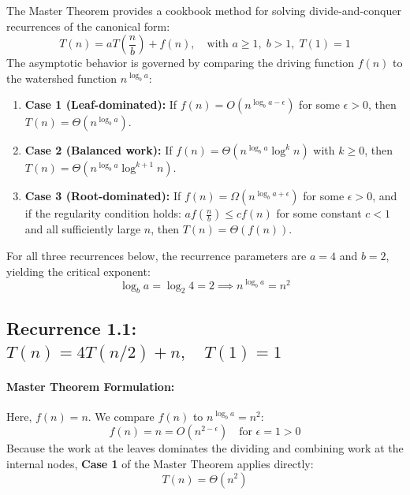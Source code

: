 \documentclass[12pt,a4paper]{article}
\theoremstyle{plain}
\theoremstyle{definition}
\theoremstyle{remark}
\begin{document}
The Master Theorem provides a cookbook method for solving divide-and-conquer recurrences of the canonical form:
\begin{equation}
T(n) = a T\left(\frac{n}{b}\right) + f(n), \quad \text{with } a \ge 1, \; b > 1, \; T(1) = 1
\end{equation}
The asymptotic behavior is governed by comparing the driving function $f(n)$ to the watershed function $n^{\log_b a}$:
\begin{enumerate}
    \item \textbf{Case 1 (Leaf-dominated):} If $f(n) = O\left(n^{\log_b a - \epsilon}\right)$ for some $\epsilon > 0$, then $T(n) = \Theta\left(n^{\log_b a}\right)$.
    \item \textbf{Case 2 (Balanced work):} If $f(n) = \Theta\left(n^{\log_b a} \log^k n\right)$ with $k \ge 0$, then $T(n) = \Theta\left(n^{\log_b a} \log^{k+1} n\right)$.
    \item \textbf{Case 3 (Root-dominated):} If $f(n) = \Omega\left(n^{\log_b a + \epsilon}\right)$ for some $\epsilon > 0$, and if the regularity condition holds: $a f\left(\frac{n}{b}\right) \le c f(n)$ for some constant $c < 1$ and all sufficiently large $n$, then $T(n) = \Theta(f(n))$.
\end{enumerate}

For all three recurrences below, the recurrence parameters are $a = 4$ and $b = 2$, yielding the critical exponent:
\begin{equation}
\log_b a = \log_2 4 = 2 \implies n^{\log_b a} = n^2
\end{equation}

\subsection{Recurrence 1.1: \texorpdfstring{$T(n) = 4 T(n/2) + n, \quad T(1) = 1$}{T(n) = 4T(n/2) + n, T(1) = 1}}

\paragraph{Master Theorem Formulation:}
Here, $f(n) = n$. We compare $f(n)$ to $n^{\log_b a} = n^2$:
\begin{equation}
f(n) = n = O\left(n^{2 - \epsilon}\right) \quad \text{for } \epsilon = 1 > 0
\end{equation}
Because the work at the leaves dominates the dividing and combining work at the internal nodes, \textbf{Case 1} of the Master Theorem applies directly:
\begin{equation}
\boxed{T(n) = \Theta\left(n^2\right)}
\end{equation}
\end{document}

